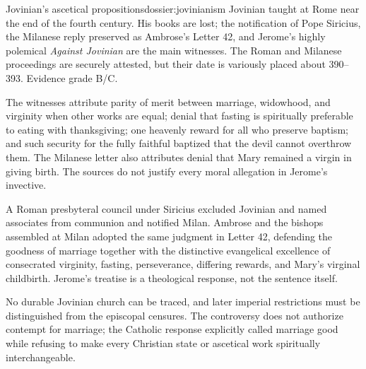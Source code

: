 \begin{heresydossier}{Jovinian's ascetical propositions}{dossier:jovinianism}
\objectfield Jovinian taught at Rome near the end of the fourth century. His books are lost; the notification of Pope Siricius, the Milanese reply preserved as Ambrose's Letter 42, and Jerome's highly polemical \emph{Against Jovinian} are the main witnesses. The Roman and Milanese proceedings are securely attested, but their date is variously placed about 390--393. Evidence grade B/C.

\propositionfield The witnesses attribute parity of merit between marriage, widowhood, and virginity when other works are equal; denial that fasting is spiritually preferable to eating with thanksgiving; one heavenly reward for all who preserve baptism; and such security for the fully faithful baptized that the devil cannot overthrow them. The Milanese letter also attributes denial that Mary remained a virgin in giving birth. The sources do not justify every moral allegation in Jerome's invective.

\responsefield A Roman presbyteral council under Siricius excluded Jovinian and named associates from communion and notified Milan. Ambrose and the bishops assembled at Milan adopted the same judgment in Letter 42, defending the goodness of marriage together with the distinctive evangelical excellence of consecrated virginity, fasting, perseverance, differing rewards, and Mary's virginal childbirth. Jerome's treatise is a theological response, not the sentence itself.

\aftermathfield No durable Jovinian church can be traced, and later imperial restrictions must be distinguished from the episcopal censures. The controversy does not authorize contempt for marriage; the Catholic response explicitly called marriage good while refusing to make every Christian state or ascetical work spiritually interchangeable.
\end{heresydossier}

